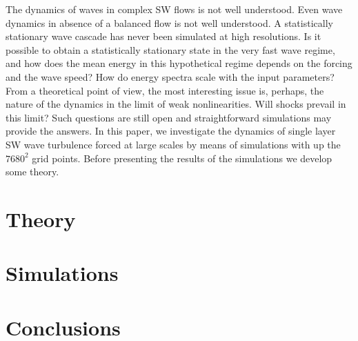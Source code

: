 \documentclass{jfm}
\begin{document}
The dynamics of waves in complex SW flows is not well
understood.  Even wave dynamics in absence of a balanced flow is not well
understood. A statistically stationary wave cascade has never been
simulated at high resolutions.
%
Is it possible to obtain a statistically stationary state in the very
fast wave regime, and how does the mean energy in this hypothetical
regime depends on the forcing and the wave speed?
How do energy spectra scale with the input parameters? From a theoretical point
of view, the most interesting issue is, perhaps, the nature of the dynamics in
the limit of weak nonlinearities. Will shocks prevail in this limit?
%
Such questions are still open and straightforward simulations may
provide the answers.
In this paper, we investigate the dynamics of single layer SW wave turbulence
forced  at large scales by means of
simulations with up the  $7680^2$ grid points.
%
Before presenting the results of the simulations we develop some theory.
%


\section{Theory}
\label{section_basic_theory}



\label{section_advanced_theory}


\section{Simulations}
\label{section_methods}



%

%



\section{Conclusions}
\end{document}
